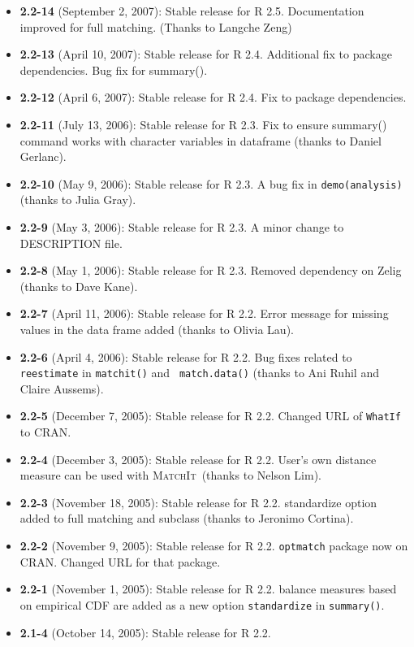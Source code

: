 \documentclass[oneside,letterpaper,12pt]{book}
\newcommand{\MatchIt}{\textsc{MatchIt}}
\begin{document}
\begin{itemize}
\item \textbf{2.2-14} (September 2, 2007): Stable release for R 2.5.
  Documentation improved for full matching. (Thanks to Langche Zeng)
\item \textbf{2.2-13} (April 10, 2007): Stable release for R
  2.4. Additional fix to package dependencies. Bug fix for summary().
\item \textbf{2.2-12} (April 6, 2007): Stable release for R 2.4. Fix
  to package dependencies.
\item \textbf{2.2-11} (July 13, 2006): Stable release for R 2.3.
  Fix to ensure summary() command works with character variables in dataframe (thanks to Daniel Gerlanc).
\item \textbf{2.2-10} (May 9, 2006): Stable release for R 2.3.
  A bug fix in {\tt demo(analysis)} (thanks to Julia Gray).
\item \textbf{2.2-9} (May 3, 2006): Stable release for R 2.3.
  A minor change to DESCRIPTION file.
\item \textbf{2.2-8} (May 1, 2006): Stable release for R 2.3.
  Removed dependency on Zelig (thanks to Dave Kane).
\item \textbf{2.2-7} (April 11, 2006): Stable release for R 2.2.
  Error message for missing values in the data frame added
  (thanks to Olivia Lau).
\item \textbf{2.2-6} (April 4, 2006): Stable release for R 2.2.
  Bug fixes related to {\tt reestimate} in {\tt matchit()} and {\tt
  match.data()} (thanks to Ani Ruhil and Claire Aussems). 
\item \textbf{2.2-5} (December 7, 2005): Stable release for R 2.2.
  Changed URL of {\tt WhatIf} to CRAN.
\item \textbf{2.2-4} (December 3, 2005): Stable release for R 2.2.
  User's own distance measure can be used with \MatchIt\, (thanks to
  Nelson Lim).
\item \textbf{2.2-3} (November 18, 2005): Stable release for R 2.2.
  standardize option added to full matching and subclass (thanks to
  Jeronimo Cortina).
\item \textbf{2.2-2} (November 9, 2005): Stable release for R 2.2.
  {\tt optmatch} package now on CRAN. Changed URL for that package. 
\item \textbf{2.2-1} (November 1, 2005): Stable release for R 2.2.
  balance measures based on empirical CDF are added as a new option
  {\tt standardize} in {\tt summary()}.
\item \textbf{2.1-4} (October 14, 2005): Stable release for R 2.2.

\end{itemize}
\end{document}
